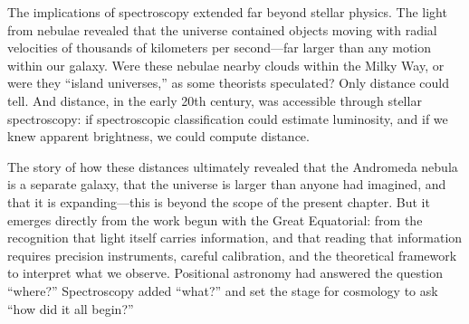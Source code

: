 The implications of spectroscopy extended far beyond stellar physics. The light from nebulae revealed that the universe contained objects moving with radial velocities of thousands of kilometers per second—far larger than any motion within our galaxy. Were these nebulae nearby clouds within the Milky Way, or were they ``island universes,'' as some theorists speculated? Only distance could tell. And distance, in the early 20th century, was accessible through stellar spectroscopy: if spectroscopic classification could estimate luminosity, and if we knew apparent brightness, we could compute distance.

The story of how these distances ultimately revealed that the Andromeda nebula is a separate galaxy, that the universe is larger than anyone had imagined, and that it is expanding—this is beyond the scope of the present chapter. But it emerges directly from the work begun with the Great Equatorial: from the recognition that light itself carries information, and that reading that information requires precision instruments, careful calibration, and the theoretical framework to interpret what we observe. Positional astronomy had answered the question ``where?'' Spectroscopy added ``what?'' and set the stage for cosmology to ask ``how did it all begin?''
